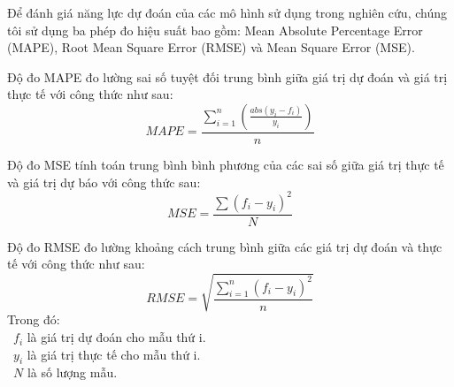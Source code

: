 Để đánh giá năng lực dự đoán của các mô hình sử dụng trong nghiên cứu, chúng tôi sử dụng ba phép đo hiệu suất bao gồm: Mean Absolute Percentage Error (MAPE), Root Mean Square Error (RMSE) và Mean Square Error (MSE).

Độ đo MAPE đo lường sai số tuyệt đối trung bình giữa giá trị dự đoán và giá trị thực tế với công thức như sau:
\[
MAPE = \frac{\sum_{i=1}^{n}\left(\frac{abs(y_i - f_i)}{y_i}\right)}{n}
\]

Độ đo MSE tính toán trung bình bình phương của các sai số giữa giá trị thực tế và giá trị dự báo với công thức sau:
\[
MSE = \frac{\sum(f_i - y_i)^2}{N}
\]

Độ đo RMSE đo lường khoảng cách trung bình giữa các giá trị dự đoán và thực tế với công thức như sau:
\[
RMSE = \sqrt{\frac{\sum_{i=1}^{n}(f_i - y_i)^2}{n}}
\]
Trong đó:\\
    \indent\textbullet\ \(f_{i}\) là giá trị dự đoán cho mẫu thứ i.\\
    \indent\textbullet\ \(y_{i}\) là giá trị thực tế cho mẫu thứ i.\\
    \indent\textbullet\ \(N\) là số lượng mẫu.

